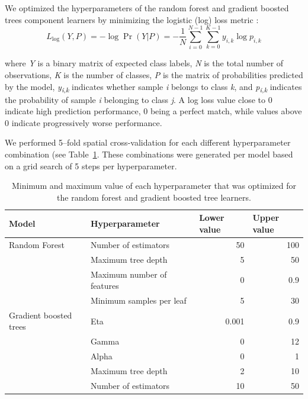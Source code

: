     We optimized the hyperparameters of the random forest and gradient boosted trees component learners by minimizing the logistic (log) loss metric  \citep{lovelace2019geocomputation}:
    \begin{equation}
        L_{\log}(Y, P) = -\log \operatorname{Pr}(Y|P) = - \frac{1}{N} \sum_{i=0}^{N-1} \sum_{k=0}^{K-1} y_{i,k} \log p_{i,k}
    \end{equation}
    
    \noindent where \emph{Y} is a binary matrix of expected class labels, \emph{N} is the total number of observations, \emph{K} is the number of classes, \emph{P} is the matrix of probabilities predicted by the model, \emph{y\textsubscript{i,k}} indicates whether sample \emph{i} belongs to class \emph{k}, and \emph{p\textsubscript{i,k}} indicates the probability of sample \emph{i} belonging to class \emph{j}. A log loss value close to 0 indicate high prediction performance, 0 being a perfect match, while values above 0 indicate progressively worse performance.
    
    We performed 5--fold spatial cross-validation for each different hyperparameter combination (see Table\@~\ref{tab:hyperparameters}. These combinations were generated per model based on a grid search of 5 steps per hyperparameter.
        
    \begin{table}[!hbt]
    \centering
    \caption{Minimum and maximum value of each hyperparameter that was optimized for the random forest and gradient boosted tree learners.}
    \label{tab:hyperparameters}
    \begin{tabular}{@{}llrr@{}}
    \toprule
    Model & Hyperparameter & \multicolumn{1}{l}{Lower value} & \multicolumn{1}{l}{Upper value} \\ 
    \midrule
    Random Forest & Number of estimators & 50 & 100 \\
     & Maximum tree depth & 5 & 50 \\
     & Maximum number of features & 0 & 0.9 \\
     & Minimum samples per leaf & 5 & 30 \\
    Gradient boosted trees & Eta & 0.001 & 0.9 \\
     & Gamma & 0 & 12 \\
     & Alpha & 0 & 1 \\
     & Maximum tree depth & 2 & 10 \\
     & Number of estimators & 10 & 50 \\ 
     \bottomrule
    \end{tabular}
    \end{table}
    

